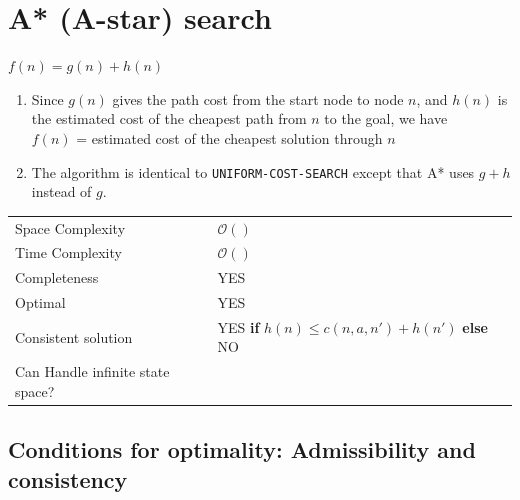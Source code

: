 \section{A* (A-star) search \cite{aci-1}} \label{A* (A-star) search}

\begin{center}
    $f(n) = g(n) + h(n)$
\end{center}


\begin{enumerate}
    \item Since $g(n)$ gives the path cost from the start node to node $n$, and $h(n)$ is the estimated cost of the cheapest path from $n$ to the goal, we have \\
    $f(n)$ = estimated cost of the cheapest solution through $n$

    \item The algorithm is identical to \verb|UNIFORM-COST-SEARCH| except that A* uses $g + h$ instead of $g$.

    
\end{enumerate}


\begin{customTableWrapper}{1.2}
\begin{longtable}{p{3cm} p{6cm}}
    Space Complexity & $\mathcal{O}()$ \\

    Time Complexity & $\mathcal{O}()$ \\

    \hline

    Completeness &  YES  \\

    Optimal & YES \\

    Consistent solution & YES \textbf{if} $h(n) \leq c(n, a, n') + h(n')$ \textbf{else} NO \\

    Can Handle infinite state space? &  \\

\end{longtable}
\end{customTableWrapper}

\subsection{Conditions for optimality: Admissibility and consistency \cite{aci-1}}

